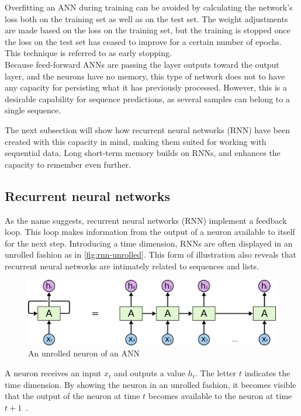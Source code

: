 Overfitting an ANN during training can be avoided by calculating the network's loss both on the training set as well as on the test set. The weight adjustments are made based on the loss on the training set, but the training is stopped once the loss on the test set has ceased to improve for a certain number of epochs. This technique is referred to as early stopping.\\

Because feed-forward ANNs are passing the layer outputs toward the output layer, and the neurons have no memory, this type of network does not to have any capacity for persisting what it has previously processed. However, this is a desirable capability for sequence predictions, as several samples can belong to a single sequence.

The next subsection will show how recurrent neural networks (RNN) have been created with this capacity in mind, making them suited for working with sequential data. Long short-term memory builds on RNNs, and enhances the capacity to remember even further.

\FloatBarrier
\subsection{Recurrent neural networks}\label{sec:recurrent-networks}
As the name suggests, recurrent neural networks (RNN) implement a feedback loop. This loop makes information from the output of a neuron available to itself for the next step. Introducing a time dimension, RNNs are often displayed in an unrolled fashion as in \autoref{fig:rnn-unrolled}. This form of illustration also reveals that recurrent neural networks are intimately related to sequences and lists.

\begin{figure}[!htb]
    \centering
    \includegraphics[width=.9\textwidth]{gfx/rnn-unrolled.png}
    \caption{An unrolled neuron of an ANN}
    \label{fig:rnn-unrolled}
\end{figure}

A neuron receives an input $x_t$ and outputs a value $h_t$. The letter $t$ indicates the time dimension. By showing the neuron in an unrolled fashion, it becomes visible that the output of the neuron at time $t$ becomes available to the neuron at time $t+1$~\cite{web:colah}.

